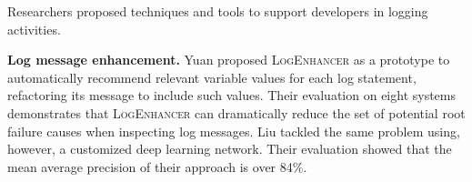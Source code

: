 %
%
%
%
%

Researchers proposed techniques and tools to support developers in logging activities.

\textbf{Log message enhancement.} Yuan \etal \cite{yuan2012improving} proposed \textsc{LogEnhancer} as a prototype to automatically recommend relevant variable values for each log statement, refactoring its message to include such values. Their evaluation on eight systems demonstrates that \textsc{LogEnhancer} can dramatically reduce the set of potential root failure causes when inspecting log messages. Liu \etal \cite{liu2019variables} tackled the same problem using, however, a customized deep learning network. Their evaluation showed that the mean average precision of their approach is over 84\%.

